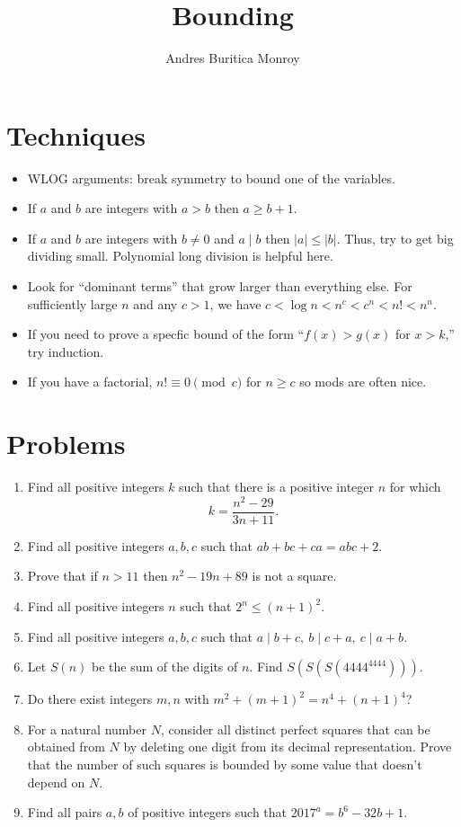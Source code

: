 \documentclass{article}
\title{Bounding}
\author{Andres Buritica Monroy}
\date{}
\begin{document}
\maketitle
\section{Techniques}
\begin{itemize}
  \item WLOG arguments: break symmetry to bound one of the variables.
  \item If $a$ and $b$ are integers with $a>b$ then $a\ge b+1$.
  \item If $a$ and $b$ are integers with $b\ne 0$ and $a\mid b$ then
    $|a|\le|b|$. Thus, try to get big dividing small. Polynomial long division
    is helpful here.
  \item Look for ``dominant terms'' that grow larger than everything else. For
    sufficiently large $n$ and any $c>1$, we have $c<\log n<n^c<c^n<n!<n^n$.
  \item If you need to prove a specfic bound of the form ``$f(x)>g(x)$ for
    $x>k$,'' try induction.
  \item If you have a factorial, $n!\equiv 0\pmod c$ for $n\ge c$ so mods are
    often nice.
\end{itemize}
\section{Problems}
\begin{enumerate}
  \item Find all positive integers $k$ such that there is a positive integer $n$
    for which
    \[k=\frac{n^2-29}{3n+11}.\]
  \item Find all positive integers $a,b,c$ such that $ab+bc+ca=abc+2$.
  \item Prove that if $n>11$ then $n^2-19n+89$ is not a square.
  \item Find all positive integers $n$ such that $2^n\le (n+1)^2$.
  \item Find all positive integers $a,b,c$ such that $a\mid b+c,\ b\mid c+a,\
    c\mid a+b$.
  \item Let $S(n)$ be the sum of the digits of $n$. Find $S(S(S(4444^{4444})))$.
  \item Do there exist integers $m,n$ with $m^2+(m+1)^2=n^4+(n+1)^4$?
  \item  For a natural number $N$, consider all distinct perfect squares that
    can be obtained from $N$ by deleting one digit from its decimal
    representation. Prove that the number of such squares is bounded by some
    value that doesn't depend on $N$.
  \item Find all pairs $a,b$ of positive integers such that $2017^a=b^6-32b+1$.
\end{enumerate}
\newpage
\end{document}
